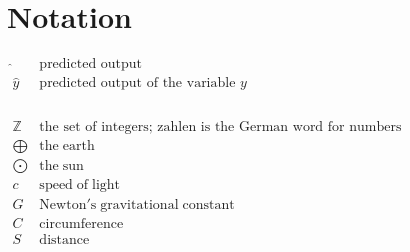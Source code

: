 \chapter{Notation}
\label{appendix:notation}

$
\begin{array}{cl}
\hat{{}} & \text{predicted output} \\
\hat{y} & \text{predicted output of the variable $y$} \\


\\ \\ \\ \\ 
\mathbb{Z} & \text{the set of integers; zahlen is the German word for numbers} \\
\bigoplus & \mathrm{the\;earth} \\
\bigodot & \mathrm{the\;sun} \\
c & \mathrm{speed\;of\;light}\\
G & \mathrm{Newton's\;gravitational\;constant} \\
C & \mathrm{circumference} \\
S & \mathrm{distance} \\
\end{array}
$